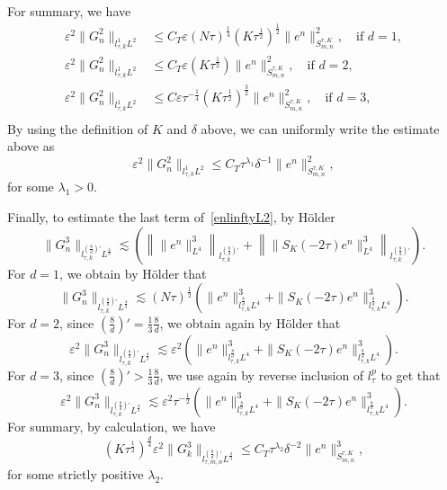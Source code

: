 \documentclass[10pt,a4paper]{article}
\begin{document}
  For summary, we have 
  \begin{equation*}
    \begin{aligned}
      \varepsilon^2\|G_n^2\|_{l^1_{\tau,k}L^2} &\leq C_T \varepsilon (N\tau)^\frac14 (K\tau^\frac12)^\frac12
      \|e^n\|_{S^{\tau,K}_{m,n}}^2,\quad \text{if }d=1,\\
      \varepsilon^2\|G_n^2\|_{l^1_{\tau,k}L^2} &\leq C_T \varepsilon (K\tau^\frac12)
      \|e^n\|_{S^{\tau,K}_{m,n}}^2,\quad \text{if }d=2,\\
      \varepsilon^2\|G_n^2\|_{l^1_{\tau,k}L^2} &\leq C \varepsilon \tau^{-\frac14} (K\tau^\frac12)^\frac32
      \|e^n\|_{S^{\tau,K}_{m,n}}^2,\quad \text{if }d=3,\\
    \end{aligned}
  \end{equation*}
  By using the definition of \(K\) and \(\delta\) above, we can uniformly write
  the estimate above as 
  \begin{equation}\label{G2}
    \varepsilon^2\|G_n^2\|_{l^1_{\tau,k}L^2} \leq C_T \tau^{\lambda_1}
    \delta^{-1} \|e^n\|_{S^{\tau,K}_{m,n}}^2,
  \end{equation}
  for some \(\lambda_1 > 0\).

  Finally, to estimate the last term of~\eqref{enlinftyL2}, by H\"older
  \[ \|G_n^3\|_{l^{(\frac8d)'}_{\tau,k}L^\frac43} \lesssim \left(
  \left\| \|e^n\|_{L^4}^3 \right\|_{l^{(\frac8d)'}_{\tau,k}} 
  + \left\| \|S_K(-2\tau)e^n \|_{L^4}^3 \right\|_{l^{(\frac8d)'}_{\tau,k}}\right). \]
  For \(d=1\), we obtain by H\"older that 
  \begin{equation*}%
    \|G_n^3\|_{l^{(\frac8d)'}_{\tau,k}L^\frac43} \lesssim 
    (N\tau)^\frac12 \left(
    \|e^n\|^3_{l^\frac8d_{\tau,k}L^4} + \|S_K(-2\tau)e^n\|_{l^\frac8d_{\tau,k}L^4}^3\right).
  \end{equation*}
  For \(d=2\), since \((\frac8d)' = \frac13\frac8d\), we obtain again by
  H\"older that 
  \begin{equation*}%
    \varepsilon^2 \|G_n^3\|_{l^{(\frac8d)'}_{\tau,k}L^\frac43} \lesssim \varepsilon^2
    \left(\|e^n\|^3_{l^\frac8d_{\tau,k}L^4} + \|S_K(-2\tau)e^n\|_{l^\frac8d_{\tau,k}L^4}^3\right).
  \end{equation*}
  For \(d=3\), since \((\frac8d)' > \frac13\frac8d\), we use again by reverse
  inclusion of \(l^p_\tau\) to get that 
  \begin{equation*}%
    \varepsilon^2 \|G_n^3\|_{l^{(\frac8d)'}_{\tau,k}L^\frac43} \lesssim \varepsilon^2 \tau^{-\frac12}
    \left(\|e^n\|^3_{l^\frac8d_{\tau,k}L^4} + \|S_K(-2\tau)e^n\|_{l^\frac8d_{\tau,k}L^4}^3\right).
  \end{equation*}
  For summary, by calculation, we have 
  \begin{equation}\label{G3}
    (K\tau^\frac12)^\frac d4 
    \varepsilon^2\|G_k^3\|_{l^{(\frac8d)'}_{\tau,m,n}L^\frac43}
    \leq C_T \tau^{\lambda_2} \delta^{-2}
    \|e^n\|_{S^{\tau,K}_{m,n}}^3,
  \end{equation}
  for some strictly positive \(\lambda_2\).
\end{document}

